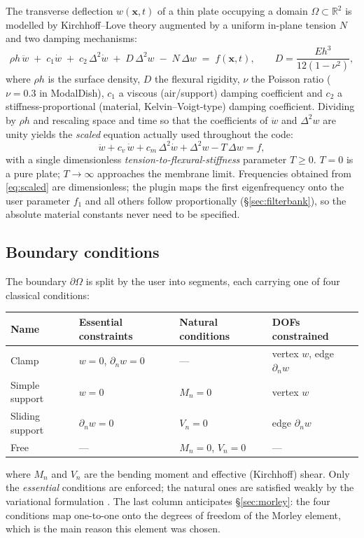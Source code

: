 \documentclass[11pt,a4paper]{article}
\newcommand{\lap}{\Delta}
\newcommand{\bilap}{\Delta^2}
\begin{document}
The transverse deflection $w(\bm{x},t)$ of a thin plate occupying a domain
$\Omega\subset\mathbb{R}^2$ is modelled by Kirchhoff--Love theory
\cite{leissa,timoshenko} augmented by a uniform in-plane tension $N$ and two
damping mechanisms:
%
\begin{equation}
  \rho h\, \ddot w
  \;+\; c_1 \dot w
  \;+\; c_2\, \bilap \dot w
  \;+\; D\, \bilap w
  \;-\; N\, \lap w
  \;=\; f(\bm{x},t),
  \qquad
  D = \frac{E h^3}{12(1-\nu^2)},
  \label{eq:physical}
\end{equation}
%
where $\rho h$ is the surface density, $D$ the flexural rigidity, $\nu$ the
Poisson ratio ($\nu = 0.3$ in ModalDish), $c_1$ a viscous (air/support)
damping coefficient and $c_2$ a stiffness-proportional (material,
Kelvin--Voigt-type) damping coefficient. Dividing by $\rho h$ and rescaling
space and time so that the coefficients of $\ddot w$ and $\bilap w$ are
unity yields the \emph{scaled} equation actually used throughout the code:
%
\begin{equation}
  \ddot w + c_v\,\dot w + c_m\, \bilap\dot w + \bilap w - T\,\lap w = f ,
  \label{eq:scaled}
\end{equation}
%
with a single dimensionless \emph{tension-to-flexural-stiffness} parameter
$T \ge 0$. $T=0$ is a pure plate; $T \to \infty$ approaches the membrane
limit. Frequencies obtained from \eqref{eq:scaled} are dimensionless; the
plugin maps the first eigenfrequency onto the user parameter $f_1$ and all
others follow proportionally (\S\ref{sec:filterbank}), so the absolute
material constants never need to be specified.

\subsection{Boundary conditions}
\label{sec:bc}

The boundary $\partial\Omega$ is split by the user into segments, each
carrying one of four classical conditions:
%
\begin{center}
\begin{tabular}{llll}
\toprule
Name & Essential constraints & Natural conditions & DOFs constrained \\
\midrule
Clamp           & $w=0$, $\partial_n w=0$      & ---              & vertex $w$, edge $\partial_n w$ \\
Simple support  & $w=0$                        & $M_n=0$          & vertex $w$ \\
Sliding support & $\partial_n w=0$             & $V_n=0$          & edge $\partial_n w$ \\
Free            & ---                          & $M_n=0$, $V_n=0$ & --- \\
\bottomrule
\end{tabular}
\end{center}
%
where $M_n$ and $V_n$ are the bending moment and effective (Kirchhoff)
shear. Only the \emph{essential} conditions are enforced; the natural ones
are satisfied weakly by the variational formulation \cite{bathe}. The last
column anticipates \S\ref{sec:morley}: the four conditions map one-to-one
onto the degrees of freedom of the Morley element, which is the main reason
this element was chosen.
\end{document}
